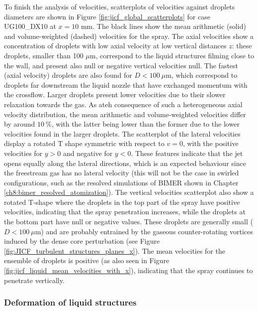 To finish the analysis of velocities, scatterplots of velocities against droplets diameters are shown in Figure \ref{fig:jicf_global_scatterplots} for case UG100\_DX10 at $x = 10$ mm. The black lines show the mean arithmetic (solid) and volume-weighted (dashed) velocities for the spray. The axial velocities show a concentration of droplets with low axial velocity at low vertical distances $z$: these droplets, smaller than 100 $\mu$m, correspond to the liquid structures filming close to the wall, and present also null or negative vertical velocities null. The fastest (axial velocity) droplets are also found for $D < 100 ~\mu$m, which correspond to droplets far downstream the liquid nozzle that have exchanged momentum with the crossflow. Larger droplets present lower velocities due to their slower relaxation towards the gas. As ateh consequence of such a heterogeneous axial velocity distribution, the mean arithmetic and volume-weighted velocities differ by around $10~\%$, with the latter being lower than the former due to the lower velocities found in the larger droplets. The scatterplot of the lateral velocities display a rotated T shape symmetric with respect to $v = 0$, with the positive velocities for $y > 0$ and negative for $y < 0$. These features indicate that the jet opens equally along the lateral directions, which is an expected behaviour since the freestream gas has no lateral velocity (this will not be the case in swirled configurations, such as the resolved simulations of BIMER shown in Chapter \ref{ch8:bimer_resolved_atomization}). The vertical velocities scatterplot also show a rotated T-shape where the droplets in the top part of the spray have positive velocities, indicating that the spray penetration increases, while the droplets at the bottom part have null or negative values. These droplets are generally small ($D < 100~\mu$m) and are probably entrained by the gaseous counter-rotating vortices induced by the dense core perturbation (see Figure \ref{fig:JICF_turbulent_structures_planes_x}). The mean velocities for the ensemble of droplets is positive (as also seen in Figure \ref{fig:jicf_liquid_mean_velocities_with_x}), indicating that the spray continues to penetrate vertically. 



\subsubsection*{Deformation of liquid structures}
\label{subsubsec:def_liquid_structures}

